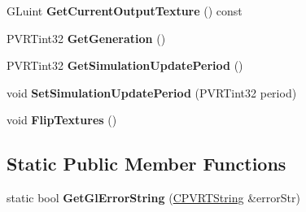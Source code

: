\begin{DoxyCompactItemize}
\item 
\hypertarget{class_game_of_life_adfff65babd7192a709233d5e366b99cf}{G\+Luint {\bfseries Get\+Current\+Output\+Texture} () const }\label{class_game_of_life_adfff65babd7192a709233d5e366b99cf}

\item 
\hypertarget{class_game_of_life_aa54743089f24ef0cbab249bd980a2eba}{P\+V\+R\+Tint32 {\bfseries Get\+Generation} ()}\label{class_game_of_life_aa54743089f24ef0cbab249bd980a2eba}

\item 
\hypertarget{class_game_of_life_a25d392bd6114aed456d541817d9b48d6}{P\+V\+R\+Tint32 {\bfseries Get\+Simulation\+Update\+Period} ()}\label{class_game_of_life_a25d392bd6114aed456d541817d9b48d6}

\item 
\hypertarget{class_game_of_life_af9219625916cb6b816a9bcaf89ae39b0}{void {\bfseries Set\+Simulation\+Update\+Period} (P\+V\+R\+Tint32 period)}\label{class_game_of_life_af9219625916cb6b816a9bcaf89ae39b0}

\item 
\hypertarget{class_game_of_life_aa207bbfc4a42b96b0bcacca243bf9456}{void {\bfseries Flip\+Textures} ()}\label{class_game_of_life_aa207bbfc4a42b96b0bcacca243bf9456}

\end{DoxyCompactItemize}
\subsection*{Static Public Member Functions}
\begin{DoxyCompactItemize}
\item 
\hypertarget{class_game_of_life_a8fafc37bcf538c4dcb3b90b800328113}{static bool {\bfseries Get\+Gl\+Error\+String} (\hyperlink{class_c_p_v_r_t_string}{C\+P\+V\+R\+T\+String} \&error\+Str)}\label{class_game_of_life_a8fafc37bcf538c4dcb3b90b800328113}

\end{DoxyCompactItemize}
